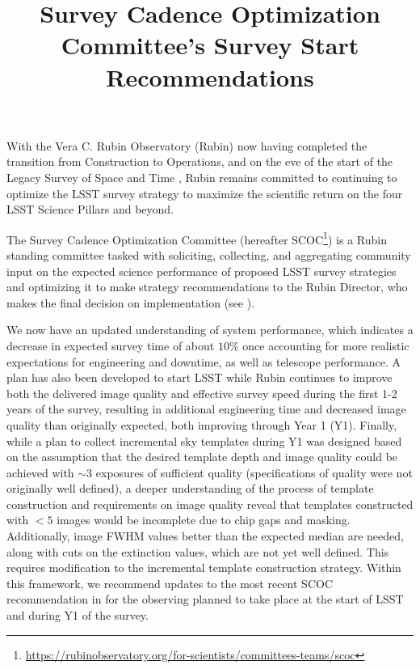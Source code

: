 \documentclass[SE,authoryear,toc]{lsstdoc}
\title{Survey Cadence Optimization Committee’s Survey Start Recommendations}
\date{\vcsDate}
\begin{document}
\maketitle

With the Vera C. Rubin Observatory (Rubin) now having completed the transition from Construction to Operations, and on the eve of the start of the Legacy Survey of Space and Time \citep[LSST][]{LPM-17},  Rubin remains committed to continuing to optimize the LSST survey strategy to maximize the scientific return on the four LSST Science Pillars and beyond. 

The Survey Cadence Optimization Committee (hereafter SCOC\footnote{\url{https://rubinobservatory.org/for-scientists/committees-teams/scoc}}) is a Rubin standing committee tasked with soliciting, collecting, and aggregating community input on the expected science performance of proposed LSST survey strategies and optimizing it to make strategy recommendations to the Rubin Director, who makes the final decision on implementation (see \citealt{Bianco_2022}). 

We now have an updated understanding of system performance, which indicates a decrease in expected survey time of about $10\%$ once accounting for more realistic expectations for engineering and downtime, as well as telescope performance. A plan has also been developed to start LSST while Rubin continues to improve both the delivered image quality and effective survey speed during the first 1-2 years of the survey, resulting in additional engineering time and decreased image quality than originally expected, both improving through Year 1 (Y1). Finally, while a plan to collect incremental sky templates during Y1 \citep{rtn-011} was designed based on the assumption that the desired template depth and image quality could be achieved with $\sim3$ exposures of sufficient quality (specifications of quality were not originally well defined), a deeper understanding of the process of template construction and requirements on image quality reveal that templates constructed with $<5$ images would be incomplete due to chip gaps and masking. Additionally, image FWHM values better than the expected median are needed, along with cuts on the extinction values, which are not yet well defined. This requires modification to the incremental template construction strategy. Within this framework, we recommend updates to the most recent SCOC recommendation in \citealt{PSTN-056}  for the observing planned to take place at the start of LSST and during Y1 of the survey.
\end{document}
